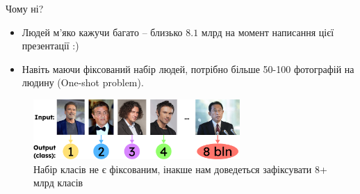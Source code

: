 \documentclass{zkdl-presentation-template}
\begin{document}
    \begin{frame}{Чому ні?}
        \begin{itemize}
            \item Людей м'яко кажучи багато -- близько $8.1$ млрд на момент написання цієї презентації :)
            \item Навіть маючи фіксований набір людей, потрібно більше 50-100 фотографій на людину (One-shot problem).
        \end{itemize}
        
        \begin{figure}
        \centering
            \includegraphics[width=0.7\textwidth]{images/too_many_people.png}
            \caption{Набір класів не є фіксованим, інакше нам доведеться зафіксувати 8+ млрд класів}
        \end{figure}
    \end{frame}
\end{document}
